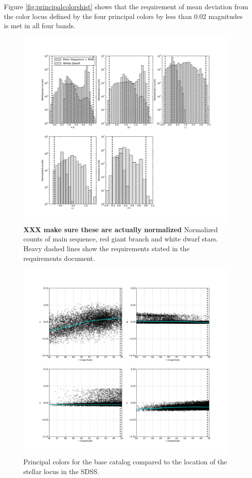 \documentclass[]{article}
\begin{document}
Figure \ref{fig:principalcolorshist} shows that the requirement of mean deviation from the color locus defined by the four principal colors by less than 
0.02 magnitudes is met in all four bands.
\begin{figure}
\centering
\includegraphics[width=5in]{validation_figures/star_lsst_color_hist.png}
\caption{{\bf XXX make sure these are actually normalized} Normalized counts of main sequence, red giant branch and white dwarf stars.  Heavy dashed lines show the requirements stated in the requirements document.\label{fig:starcolorspan}}
\end{figure}

\begin{figure}
\centering
\includegraphics[width=5in]{validation_figures/principal_colors_vr.png}
\caption{Principal colors for the base catalog compared to the location of the stellar locus in the SDSS.\label{fig:principalcolors}}
\end{figure}
\end{document}
